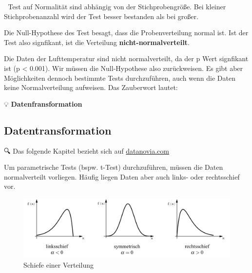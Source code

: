 \documentclass[
]{article}
\newenvironment{Shaded}{\begin{snugshade}}{\end{snugshade}}
\newcommand{\DocumentationTok}[1]{\textcolor[rgb]{0.56,0.35,0.01}{\textbf{\textit{#1}}}}
\newcommand{\FunctionTok}[1]{\textcolor[rgb]{0.00,0.00,0.00}{#1}}
\newcommand{\NormalTok}[1]{#1}
\newcommand{\SpecialCharTok}[1]{\textcolor[rgb]{0.00,0.00,0.00}{#1}}
\begin{document}
🚨 Test auf Normalität sind abhängig von der Stichprobengröße. Bei kleiner Stichprobenanzahl wird der Test besser bestanden als bei großer.

Die Null-Hypothese des Test besagt, dass die Probenverteilung normal ist. Ist der Test also signfikant, ist die Verteilung \textbf{nicht-normalverteilt}.

\begin{Shaded}
\end{Shaded}

Die Daten der Lufttemperatur sind nicht normalverteilt, da der p Wert signfikant ist (p \textless{} 0.001). Wir müssen die Null-Hypothese also zurückweisen. Es gibt aber Möglichkeiten dennoch bestimmte Tests durchzuführen, auch wenn die Daten keine Normalverteilung aufweisen. Das Zauberwort lautet:

💡 \textbf{Datenfransformation}

\hypertarget{datentransformation}{%
\subsection{Datentransformation}\label{datentransformation}}

🔍 Das folgende Kapitel bezieht sich auf \href{https://www.datanovia.com/en/lessons/transform-data-to-normal-distribution-in-r/}{datanovia.com}

Um parametrische Tests (bspw. t-Test) durchzuführen, müssen die Daten normalverteilt vorliegen. Häufig liegen Daten aber auch links- oder rechtsschief vor.

\begin{figure}

{\centering \includegraphics[width=16.96in]{images/045} 

}

\caption{Schiefe einer Verteilung}\label{fig:unnamed-chunk-254}
\end{figure}
\end{document}
